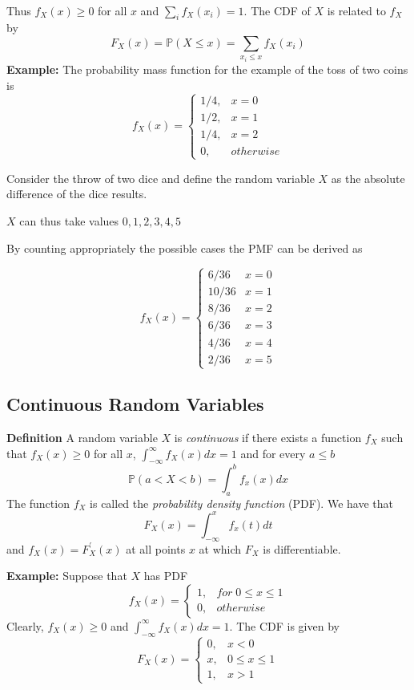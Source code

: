 \documentclass[
]{book}
\theoremstyle{definition}
\theoremstyle{definition}
\theoremstyle{definition}
\theoremstyle{definition}
\theoremstyle{remark}
\begin{document}
~

Thus \(f_X(x)\geq 0\) for all \(x\) and \(\sum_i f_X(x_i)=1\). The CDF of \(X\) is related to \(f_X\) by
\[
F_X(x)=\mathbb{P}(X\leq x)=\sum_{x_i\leq x}f_X(x_i)
\]
\textbf{Example:} The probability mass function for the example of the toss of two coins is
\[
f_X(x)=\left\{
\begin{array}{ll}
1/4, & x=0\\
1/2, & x=1\\
1/4, & x=2 \\
0, & otherwise
\end{array}
\right.
\]

Consider the throw of two dice and define the random variable \(X\) as the absolute difference of the dice results.

\(X\) can thus take values \({0,1,2,3,4,5}\)

By counting appropriately the possible cases the PMF can be derived as

\[
f_X(x)=\left\{
\begin{array}{ll}
6/36 & x=0 \\
10/36 & x=1 \\
8/36 & x=2\\
6/36 & x=3 \\
4/36 & x=4\\
2/36 & x=5
\end{array}
\right.
\]

\hypertarget{continuous-random-variables}{%
\subsection{Continuous Random Variables}\label{continuous-random-variables}}

\textbf{Definition} A random variable \(X\) is \emph{continuous} if there exists a function \(f_X\) such that \(f_X(x)\geq 0\) for all \(x\), \(\int_{-\infty}^{\infty}f_X(x)dx=1\) and for every \(a\leq b\)
\[
\mathbb{P}(a<X<b)=\int_a^bf_x(x)dx
\]
The function \(f_X\) is called the \emph{probability density function} (PDF). We have that
\[
F_X(x)=\int_{-\infty}^xf_x(t)dt
\]
and \(f_X(x)=F_X^{'}(x)\) at all points \(x\) at which \(F_X\) is differentiable.

\textbf{Example:} Suppose that \(X\) has PDF
\[
f_X(x)=\left\{
\begin{array}{ll}
1, & for  \; 0\leq x\leq 1\\
0, & otherwise
\end{array}
\right.
\]
Clearly, \(f_X(x)\geq 0\) and \(\int_{-\infty}^{\infty}f_X(x)dx=1\). The CDF is given by
\[
F_X(x)=\left\{
\begin{array}{ll}
0, & x<0\\
x, & 0\leq x \leq 1\\
1, & x>1
\end{array}
\right.
\]
\end{document}
